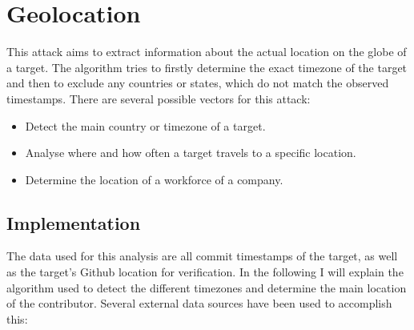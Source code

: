 \section{Geolocation}

This attack aims to extract information about the actual location on the globe of a target.
The algorithm tries to firstly determine the exact timezone of the target and then to exclude any countries or states, which do not match the observed timestamps.
There are several possible vectors for this attack:

\begin{itemize}
    \item Detect the main country or timezone of a target.
    \item Analyse where and how often a target travels to a specific location.
    \item Determine the location of a workforce of a company.
\end{itemize}


\subsection{Implementation}\label{travel-implementation}

The data used for this analysis are all commit timestamps of the target, as well as the target's Github location for verification.
In the following I will explain the algorithm used to detect the different timezones and determine the main location of the contributor.
Several external data sources have been used to accomplish this:


